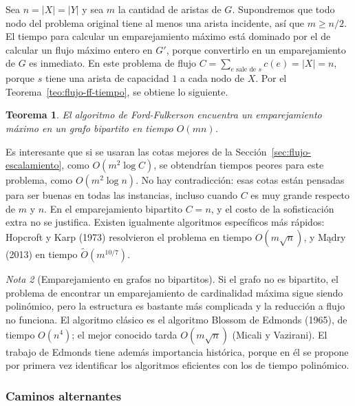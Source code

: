 \documentclass[12pt, spanish, oneside, openany]{book}
\theoremstyle{uprightplain}
\newtheorem{teorema}{Teorema}[section]
\theoremstyle{definition}
\theoremstyle{remark}
\newtheorem{nota}[teorema]{Nota}
\theoremstyle{definition}
\begin{document}
Sea $n=|X|=|Y|$ y sea $m$ la cantidad de aristas de $G$. Supondremos que todo nodo del problema original tiene al menos una arista incidente, así que $m\ge n/2$. El tiempo para calcular un emparejamiento máximo está dominado por el de calcular un flujo máximo entero en $G'$, porque convertirlo en un emparejamiento de $G$ es inmediato. En este problema de flujo $C=\sum_{e\text{ sale de }s}c(e)=|X|=n$, porque $s$ tiene una arista de capacidad $1$ a cada nodo de $X$. Por el Teorema~\ref{teo:flujo-ff-tiempo}, se obtiene lo siguiente.

\begin{teorema}
\label{teo:flujo-emparejamiento-tiempo}
El algoritmo de Ford-Fulkerson encuentra un emparejamiento máximo en un grafo bipartito en tiempo $O(mn)$.
\end{teorema}

Es interesante que si se usaran las cotas mejores de la Sección~\ref{sec:flujo-escalamiento}, como $O(m^2\log C)$, se obtendrían tiempos peores para este problema, como $O(m^2\log n)$. No hay contradicción: esas cotas están pensadas para ser buenas en todas las instancias, incluso cuando $C$ es muy grande respecto de $m$ y $n$. En el emparejamiento bipartito $C=n$, y el costo de la sofisticación extra no se justifica. Existen igualmente algoritmos específicos más rápidos: Hopcroft y Karp (1973) resolvieron el problema en tiempo $O(m\sqrt{n})$, y Mądry (2013) en tiempo $\tilde O(m^{10/7})$.

\begin{nota}[Emparejamiento en grafos no bipartitos]
\label{nota:flujo-no-bipartito}
Si el grafo no es bipartito, el problema de encontrar un emparejamiento de cardinalidad máxima sigue siendo polinómico, pero la estructura es bastante más complicada y la reducción a flujo no funciona. El algoritmo clásico es el algoritmo Blossom de Edmonds (1965), de tiempo $O(n^4)$; el mejor conocido tarda $O(m\sqrt n)$ (Micali y Vazirani). El trabajo de Edmonds tiene además importancia histórica, porque en él se propone por primera vez identificar los algoritmos eficientes con los de tiempo polinómico.
\end{nota}

\subsubsection{Caminos alternantes}
\end{document}
